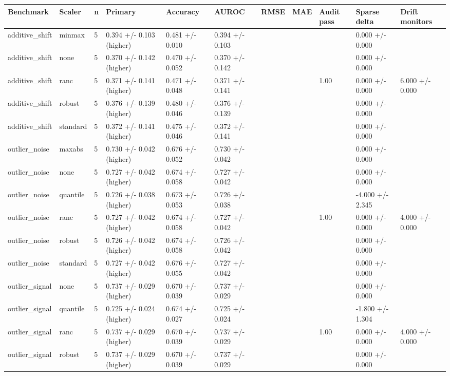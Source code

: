 \begin{tabular}{lllllllllll}
\toprule
Benchmark & Scaler & n & Primary & Accuracy & AUROC & RMSE & MAE & Audit pass & Sparse delta & Drift monitors \\
\midrule
additive\_shift & minmax & 5 & 0.394 +/- 0.103 (higher) & 0.481 +/- 0.010 & 0.394 +/- 0.103 &  &  &  & 0.000 +/- 0.000 &  \\
additive\_shift & none & 5 & 0.370 +/- 0.142 (higher) & 0.470 +/- 0.052 & 0.370 +/- 0.142 &  &  &  & 0.000 +/- 0.000 &  \\
additive\_shift & ranc & 5 & 0.371 +/- 0.141 (higher) & 0.471 +/- 0.048 & 0.371 +/- 0.141 &  &  & 1.00 & 0.000 +/- 0.000 & 6.000 +/- 0.000 \\
additive\_shift & robust & 5 & 0.376 +/- 0.139 (higher) & 0.480 +/- 0.046 & 0.376 +/- 0.139 &  &  &  & 0.000 +/- 0.000 &  \\
additive\_shift & standard & 5 & 0.372 +/- 0.141 (higher) & 0.475 +/- 0.046 & 0.372 +/- 0.141 &  &  &  & 0.000 +/- 0.000 &  \\
outlier\_noise & maxabs & 5 & 0.730 +/- 0.042 (higher) & 0.676 +/- 0.052 & 0.730 +/- 0.042 &  &  &  & 0.000 +/- 0.000 &  \\
outlier\_noise & none & 5 & 0.727 +/- 0.042 (higher) & 0.674 +/- 0.058 & 0.727 +/- 0.042 &  &  &  & 0.000 +/- 0.000 &  \\
outlier\_noise & quantile & 5 & 0.726 +/- 0.038 (higher) & 0.673 +/- 0.053 & 0.726 +/- 0.038 &  &  &  & -4.000 +/- 2.345 &  \\
outlier\_noise & ranc & 5 & 0.727 +/- 0.042 (higher) & 0.674 +/- 0.058 & 0.727 +/- 0.042 &  &  & 1.00 & 0.000 +/- 0.000 & 4.000 +/- 0.000 \\
outlier\_noise & robust & 5 & 0.726 +/- 0.042 (higher) & 0.674 +/- 0.058 & 0.726 +/- 0.042 &  &  &  & 0.000 +/- 0.000 &  \\
outlier\_noise & standard & 5 & 0.727 +/- 0.042 (higher) & 0.676 +/- 0.055 & 0.727 +/- 0.042 &  &  &  & 0.000 +/- 0.000 &  \\
outlier\_signal & none & 5 & 0.737 +/- 0.029 (higher) & 0.670 +/- 0.039 & 0.737 +/- 0.029 &  &  &  & 0.000 +/- 0.000 &  \\
outlier\_signal & quantile & 5 & 0.725 +/- 0.024 (higher) & 0.674 +/- 0.027 & 0.725 +/- 0.024 &  &  &  & -1.800 +/- 1.304 &  \\
outlier\_signal & ranc & 5 & 0.737 +/- 0.029 (higher) & 0.670 +/- 0.039 & 0.737 +/- 0.029 &  &  & 1.00 & 0.000 +/- 0.000 & 4.000 +/- 0.000 \\
outlier\_signal & robust & 5 & 0.737 +/- 0.029 (higher) & 0.670 +/- 0.039 & 0.737 +/- 0.029 &  &  &  & 0.000 +/- 0.000 &  \\

\end{tabular}
